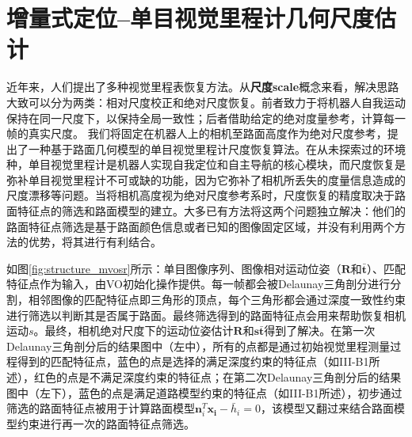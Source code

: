 \chapter{增量式定位--单目视觉里程计几何尺度估计}

近年来，人们提出了多种视觉里程表恢复方法。从\textbf{尺度scale}概念来看，解决思路大致可以分为两类：相对尺度校正和绝对尺度恢复。前者致力于将机器人自我运动保持在同一尺度下，以保持全局一致性；后者借助给定的绝对度量参考，计算每一帧的真实尺度。
我们将固定在机器人上的相机至路面高度作为绝对尺度参考，提出了一种基于路面几何模型的单目视觉里程计尺度恢复算法。在从未探索过的环境种，单目视觉里程计是机器人实现自我定位和自主导航的核心模块，而尺度恢复是弥补单目视觉里程计不可或缺的功能，因为它弥补了相机所丢失的度量信息造成的尺度漂移等问题。当将相机高度视为绝对尺度参考系时，尺度恢复的精度取决于路面特征点的筛选和路面模型的建立。大多已有方法将这两个问题独立解决：他们的路面特征点筛选是基于路面颜色信息或者已知的图像固定区域，并没有利用两个方法的优势，将其进行有利结合。

如图\ref{fig:structure_mvosr}所示：单目图像序列、图像相对运动位姿（$\mathbf{R}$和$\mathbf{\bar{t}}$）、匹配特征点作为输入，由VO初始化操作提供。每一帧都会被Delaunay三角剖分进行分割，相邻图像的匹配特征点即三角形的顶点，每个三角形都会通过深度一致性约束进行筛选以判断其是否属于路面。最终筛选得到的路面特征点会用来帮助恢复相机运动$s$。最终，相机绝对尺度下的运动位姿估计$\mathbf{R}$和$\mathbf{s\bar{t}}$得到了解决。在第一次Delaunay三角剖分后的结果图中（左中），所有的点都是通过初始视觉里程测量过程得到的匹配特征点，蓝色的点是选择的满足深度约束的特征点（如III-B1所述），红色的点是不满足深度约束的特征点；在第二次Delaunay三角剖分后的结果图中（左下），蓝色的点是满足道路模型约束的特征点（如III-B1所述），初步通过筛选的路面特征点被用于计算路面模型$\mathbf{n}^T_i\mathbf{x_i}-\bar{h}_{i}=0$，该模型又翻过来结合路面模型约束进行再一次的路面特征点筛选。


